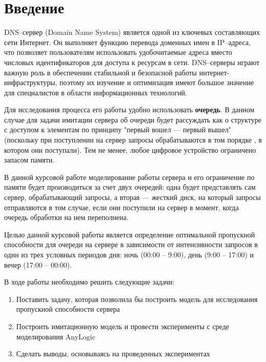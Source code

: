 

\def\oldbibitem{}
\let\oldbibitem=\bibitem
\def\bibitem{\stepcounter{citenum}\oldbibitem}




\tableofcontents
\newpage
\section{Введение}
DNS--сервер (Domain Name System) является одной из ключевых составляющих сети Интернет. Он выполняет функцию перевода доменных имен в IP--адреса,
что позволяет пользователям использовать удобочитаемые адреса вместо числовых идентификаторов для доступа к ресурсам в сети. DNS--серверы играют
важную роль в обеспечении стабильной и безопасной работы интернет-инфраструктуры, поэтому их изучение и оптимизация имеют большое значение для
специалистов в области информационных технологий.

Для исследования процесса его работы удобно использовать \textbf{очередь}. В данном случае для задачи имитации сервера об очереди будет рассуждать как
о структуре с доступом к элементам по принципу "первый вошел --- первый вышел" (поскольку при поступлении на сервер запросы обрабатываются в том порядке
, в котором они поступали). Тем не менее, любое цифровое устройство ограничено запасом памяти.

В данной курсовой работе моделирование работы сервера и его ограничение по памяти будет производиться за счет двух очередей: одна будет
представлять сам сервер, обрабатывающий запросы, а вторая --- жесткий диск, на который запросы отправляются в том случае, если они поступили на сервер в момент,
когда очередь обработки на нем переполнена.

Целью данной курсовой работы является определение оптимальной пропускной способности для очереди на сервере в зависимости от интенсивности запросов в
один из трех условных периодов дня: ночь (00:00 -- 9:00), день (9:00 -- 17:00) и вечер (17:00 -- 00:00).

В ходе работы необходимо решить следующие задачи:
\begin{enumerate}
    \item Поставить задачу, которая позволила бы построить модель для исследования пропускной способности сервера
    \item Построить имитационную модель и провести эксперименты с среде моделирования AnyLogic
    \item Сделать выводы, основываясь на проведенных экспериментах
\end{enumerate}

